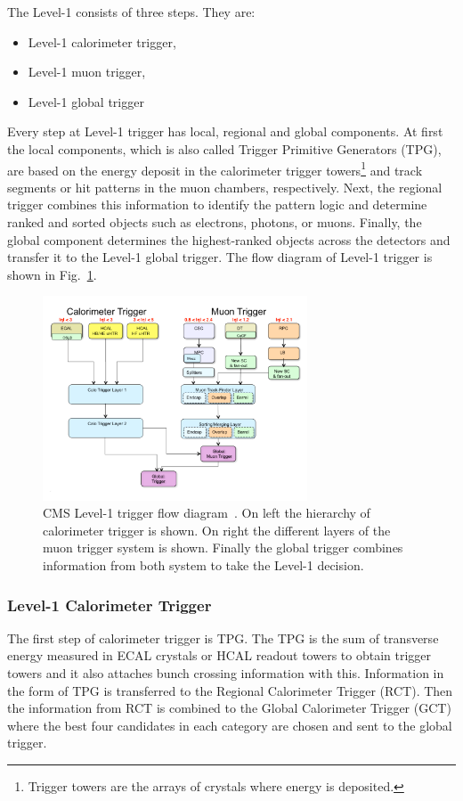 The Level-1 consists of three steps. They are:
\begin{itemize}
	\item Level-1 calorimeter trigger,
	\item Level-1 muon trigger,
	\item Level-1 global trigger
\end{itemize}
Every step at Level-1 trigger has local, regional and global components. At first the local components, which is also called Trigger Primitive Generators (TPG), are based on the energy deposit in the calorimeter trigger towers\footnote{Trigger towers are the arrays of crystals where energy is deposited.} and track segments or hit patterns in the muon chambers, respectively. 
Next, the regional trigger combines this information to identify the pattern logic and determine ranked and sorted objects such as electrons, photons, or muons. Finally, the global component determines the highest-ranked objects across the detectors and transfer it to the Level-1 global trigger. The flow diagram of Level-1 trigger is shown in Fig.~\ref{fig:cms-L1-trigger}.
\begin{figure}[htbp]
	\centering
	\includegraphics[width=0.7\textwidth]{figures/LHC/TriggerBlockDiagram_Eta.pdf}
	\caption{CMS Level-1 trigger flow diagram~\cite{L1trigger-2013}. On left the hierarchy of calorimeter trigger is shown. On right the different layers of the muon trigger system is shown. Finally the global trigger combines information from both system to take the Level-1 decision.}
	\label{fig:cms-L1-trigger}
\end{figure}

\subsubsection{Level-1 Calorimeter Trigger} %
\label{ssub:l1_calorimeter_trigger}
The first step of calorimeter trigger is TPG. The TPG is the sum of transverse energy measured in ECAL crystals or HCAL readout towers to obtain trigger towers and it also attaches bunch crossing information with this. Information in the form of TPG is transferred to the Regional Calorimeter Trigger (RCT). Then the information from RCT is combined to the Global Calorimeter Trigger (GCT) where the best four candidates in each category are chosen and sent to the global trigger.

